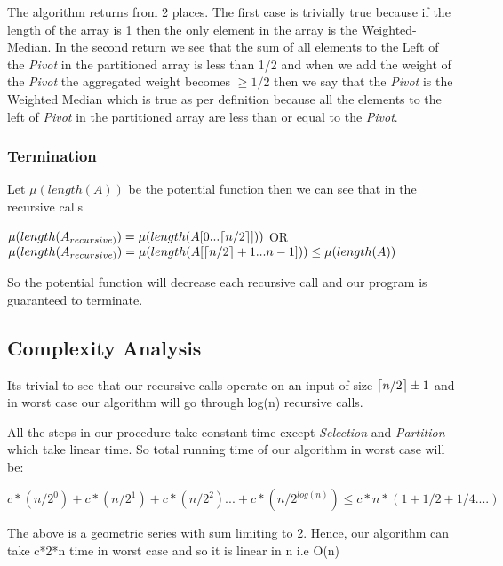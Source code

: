 \documentclass[8pt]{article}
\DeclarePairedDelimiter\ceil{\lceil}{\rceil}
\begin{document}
\begin{flushleft}
The algorithm returns from 2 places. The first case is trivially true because if the length
of the array is 1 then the only element in the array is the Weighted-Median. In the second
return we see that the sum of all elements to the Left of the \textit{Pivot} in the partitioned
array is less than 1/2 and when we add the weight of the \textit{Pivot} the aggregated weight
becomes $\geq{1/2}$ then we say that the \textit{Pivot} is the Weighted Median which is true
as per definition because all the elements to the left of \textit{Pivot} in the partitioned
array are less than or equal to the \textit{Pivot}.

\subsubsection{Termination}
Let $\mu(length(A))$ be the potential function then we can see that in the recursive calls

\begin{center}
    $\mu(length(A_{recursive)}) = \mu(length(A[0...\ceil{n/2}]))$ OR $\mu(length(A_{recursive)}) = \mu(length(A[\ceil{n/2} + 1 ... n - 1])) \leq \mu(length(A))$
\end{center}

So the potential function will decrease each recursive call and our program is guaranteed to terminate.

\subsection{Complexity Analysis}
Its trivial to see that our recursive calls operate on an input of size $\ceil{n/2} \pm 1$ and in 
worst case our algorithm will go through log(n) recursive calls.

All the steps in our procedure take constant time except \textit{Selection} and \textit{Partition}
which take linear time. So total running time of our algorithm in worst case will be:
\begin{center}
$c*(n/2^0) + c*(n/2^1) + c*(n/2^2) ... + c*(n/2^{log(n)}) \le c*n*(1 + 1/2 + 1/4 ....)$
\end{center}
The above is a geometric series with sum limiting to 2. Hence, our algorithm can take c*2*n time in worst case and so it is linear in n i.e O(n)
\end{flushleft}
\end{document}
